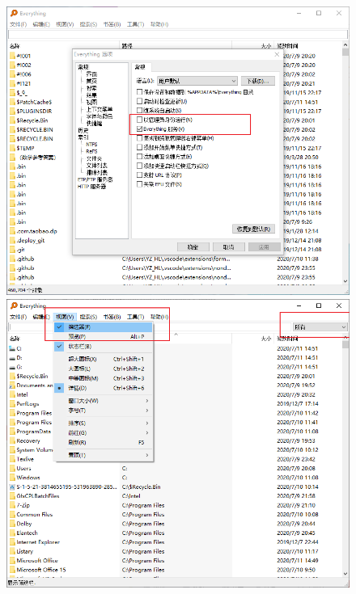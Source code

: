 \documentclass{article}
\begin{document}
            \begin{figure}[htbp]
            \centering
            \begin{minipage}[t]{0.44\textwidth}
            \centering
            \includegraphics[scale=0.25]{2.1-p1.png}
            \end{minipage}
            \begin{minipage}[t]{0.44\textwidth}
            \centering
            \includegraphics[scale=0.25]{2.1-p2.png}
            \end{minipage}
            \end{figure}
\end{document}
